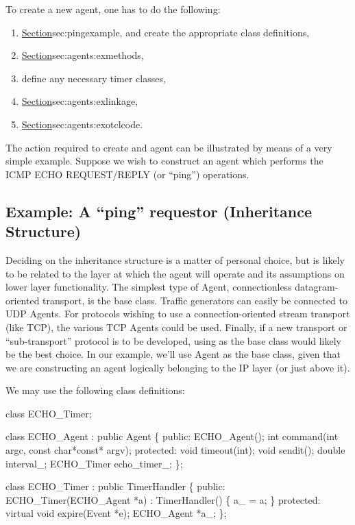 To create a new agent, one has to do the following:
\begin{enumerate}\itemsep0pt
        \item \href{decide its inheritance structure}{Section}{sec:pingexample},
                and create the appropriate class definitions,
        \item \href{define the \fcn[]{recv} and \fcn[]{timeout} methods}{%
                Section}{sec:agents:exmethods},
        \item define any necessary timer classes,
        \item \href{define OTcl linkage functions}{Section}{sec:agents:exlinkage},
        \item \href{write the necessary OTcl code to access the agent}{Section}{sec:agents:exotclcode}.
\end{enumerate}

The action required to create and agent can be illustrated
by means of a very simple example.
Suppose we wish to construct an agent which performs
the ICMP ECHO REQUEST/REPLY (or ``ping'') operations.

\subsection{Example: A ``ping'' requestor (Inheritance Structure)}
\label{sec:pingexample}

Deciding on the inheritance structure is a matter of personal choice, but is
likely to be related to the layer at which the agent will operate
and its assumptions on lower layer functionality.
The simplest type of Agent, connectionless datagram-oriented transport, is
the  base class.  Traffic generators can easily be connected
to UDP Agents.
For protocols wishing to use a connection-oriented stream transport
(like TCP), the various TCP Agents could be used.
Finally, if a new transport or ``sub-transport'' protocol
is to be developed, using 
as the base class would likely be the best choice.
In our example, we'll use Agent as the base class, given that
we are constructing an agent logically belonging to the IP layer
(or just above it).

We may use the following class definitions:
\begin{program}
        class ECHO_Timer;
 
        class ECHO_Agent : public Agent \{
         public:
                ECHO_Agent();
                int command(int argc, const char*const* argv);
         protected:
                void timeout(int);
                void sendit();
                double interval_;
                ECHO_Timer echo_timer_;
        \};

        class ECHO_Timer : public TimerHandler \{
        public:
                ECHO_Timer(ECHO_Agent *a) : TimerHandler() \{ a_ = a; \}
        protected:
                virtual void expire(Event *e);
                ECHO_Agent *a_;
        \}; 
\end{program}

